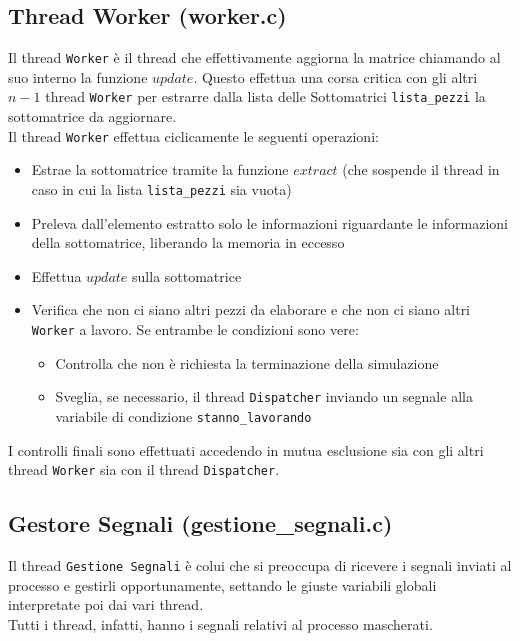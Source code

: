 \documentclass[]{article}
\begin{document}
\subsection{Thread Worker (worker.c)}
Il thread \texttt{Worker} è il thread che effettivamente aggiorna la matrice chiamando al suo interno la funzione $update$. Questo effettua una corsa critica con gli altri $n-1$ thread \texttt{Worker} per estrarre dalla lista delle Sottomatrici \texttt{lista\_pezzi} la sottomatrice da aggiornare.\\
Il thread \texttt{Worker} effettua ciclicamente le seguenti operazioni:
\begin{itemize}
	\item Estrae la sottomatrice tramite la funzione $extract$ (che sospende il thread in caso in cui la lista \texttt{lista\_pezzi} sia vuota)
	\item Preleva dall'elemento estratto solo le informazioni riguardante le informazioni della sottomatrice, liberando la memoria in eccesso
	\item Effettua $update$ sulla sottomatrice
	\item Verifica che non ci siano altri pezzi da elaborare e che non ci siano altri \texttt{Worker} a lavoro. Se entrambe le condizioni sono vere:
		\begin{itemize}
			\item Controlla che non è richiesta la terminazione della simulazione
			\item Sveglia, se necessario, il thread \texttt{Dispatcher} inviando un segnale alla variabile di condizione \texttt{stanno\_lavorando}
		\end{itemize}
	\end{itemize}
I controlli finali sono effettuati accedendo in mutua esclusione sia con gli altri thread \texttt{Worker} sia con il thread \texttt{Dispatcher}. 
\subsection{Gestore Segnali (gestione\_segnali.c)}
Il thread \texttt{Gestione Segnali} è colui che si preoccupa di ricevere i segnali inviati al processo e gestirli opportunamente, settando le giuste variabili globali interpretate poi dai vari thread.\\
Tutti i thread, infatti, hanno i segnali relativi al processo mascherati. \\
\end{document}
